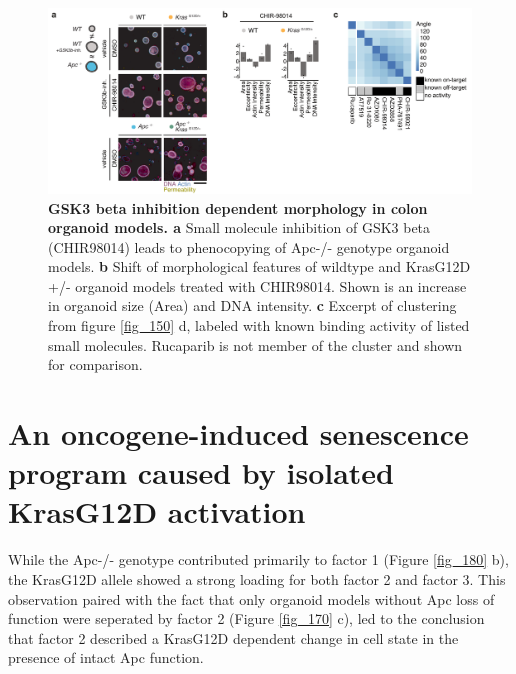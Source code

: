 \begin{flushleft}
\begin{figure}[h]
\centering
\includegraphics[scale=0.75,
                keepaspectratio]{figures/adenomaprofiling/pdf/fig_2_4.pdf}
\caption{\textbf{GSK3 beta inhibition dependent morphology in colon organoid models. a} Small molecule inhibition of GSK3 beta (CHIR98014) leads to phenocopying of Apc-/- genotype organoid models. \textbf{b} Shift of morphological features of wildtype and KrasG12D +/- organoid models treated with CHIR98014. Shown is an increase in organoid size (Area) and DNA intensity. \textbf{c} Excerpt of clustering from figure \ref{fig_150} d, labeled with known binding activity of listed small molecules. Rucaparib is not member of the cluster and shown for comparison.}
\label{fig_185}
\end{figure}
\bigbreak



\newpage

\section{An oncogene-induced senescence program caused by isolated KrasG12D activation}
While the Apc-/- genotype contributed primarily to factor 1 (Figure \ref{fig_180} b), the KrasG12D allele showed a strong loading for both factor 2 and factor 3. This observation paired with the fact that only organoid models without Apc loss of function were seperated by factor 2 (Figure \ref{fig_170} c), led to the conclusion that factor 2 described a KrasG12D dependent change in cell state in the presence of intact Apc function.



\end{flushleft}
